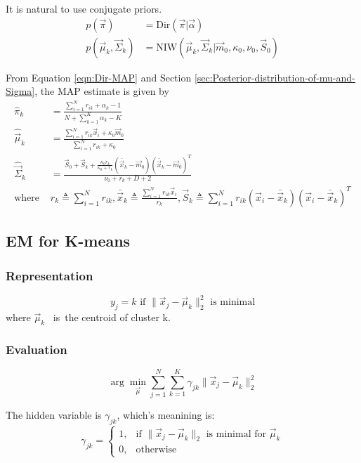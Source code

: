 It is natural to use conjugate priors. 
\begin{align*}
p(\vec{\pi}) & = \mathrm{Dir}(\vec{\pi}|\vec{\alpha}) \\
p(\vec{\mu}_k,\vec{\Sigma}_k) & = \mathrm{NIW}(\vec{\mu}_k,\vec{\Sigma}_k|\vec{m}_0,\kappa_0,\nu_0,\vec{S}_0)
\end{align*}

From Equation \eqref{eqn:Dir-MAP} and Section \ref{sec:Posterior-distribution-of-mu-and-Sigma}, the MAP estimate is given by
\begin{align}
\hat{\pi}_k & = \frac{\sum_{i=1}^N r_{ik}+\alpha_k-1}{N+\sum_{k=1}^K \alpha_k-K} \\
\hat{\vec{\mu}}_k & = \frac{\sum_{i=1}^N r_{ik}\vec{x}_i + \kappa_0\vec{m}_0}{\sum_{i=1}^N r_{ik} + \kappa_0} \\
\hat{\vec{\Sigma}}_k & = \frac{\vec{S}_0+\vec{S}_k+\frac{\kappa_0r_k}{\kappa_0+r_k}(\bar{\vec{x}}_k-\vec{m}_0)(\bar{\vec{x}}_k-\vec{m}_0)^T}{\nu_0+r_k+D+2} \\
\text{where } & r_k \triangleq \sum_{i=1}^N r_{ik}, \bar{\vec{x}}_k \triangleq \frac{\sum_{i=1}^N r_{ik}\vec{x}_i}{r_k},\vec{S}_k \triangleq \sum_{i=1}^N r_{ik} (\vec{x}_i-\bar{\vec{x}}_k)(\vec{x}_i-\bar{\vec{x}}_k)^T \nonumber
\end{align}


\subsection{EM for K-means}
\label{sec:K-means}

\subsubsection{Representation}
\begin{equation}
y_j=k \text{ if } \|\vec{x}_j-\vec{\mu}_k\|_2^2 \text{ is minimal}
\end{equation}
where $\vec{\mu}_k$ \ is\ the centroid of cluster k.


\subsubsection{Evaluation}
\begin{equation}
\arg\min\limits_{\vec{\mu}} \sum_{j=1}^N {\sum_{k=1}^K}\gamma_{jk}{\|\vec{x}_j-\vec{\mu}_k\|_2^2}
\end{equation}

The hidden variable is $\gamma_{jk}$, which's meanining is:
\begin{equation} \nonumber
\gamma_{jk}=\begin{cases}
1, & \text{if } \|\vec{x}_j-\vec{\mu}_k\|_2 \text{ is minimal for } \vec{\mu}_k \\
0, & \text{otherwise}
\end{cases}
\end{equation}


